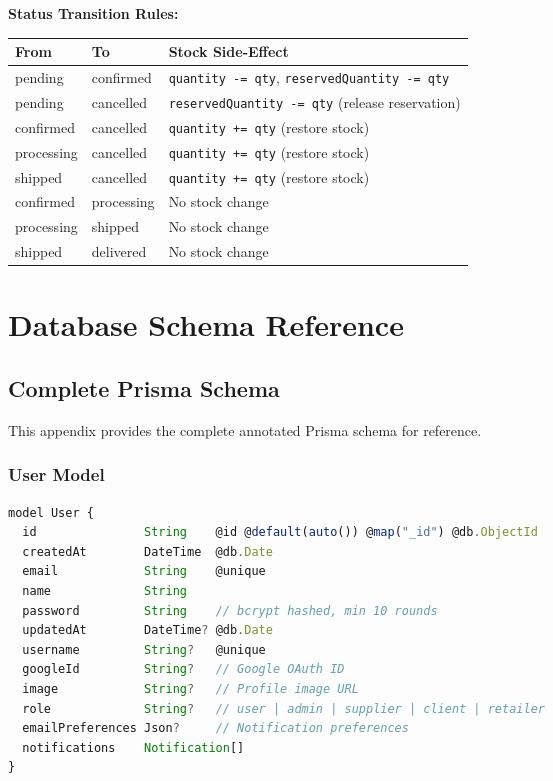 ﻿\documentclass[12pt,a4paper]{report}
\begin{document}
\textbf{Status Transition Rules:}
\begin{center}
\begin{tabularx}{\textwidth}{llX}
  \toprule
  \textbf{From} & \textbf{To} & \textbf{Stock Side-Effect} \\
  \midrule
  pending    & confirmed   & \texttt{quantity -= qty}, \texttt{reservedQuantity -= qty} \\
  pending    & cancelled   & \texttt{reservedQuantity -= qty} (release reservation) \\
  confirmed  & cancelled   & \texttt{quantity += qty} (restore stock) \\
  processing & cancelled   & \texttt{quantity += qty} (restore stock) \\
  shipped    & cancelled   & \texttt{quantity += qty} (restore stock) \\
  confirmed  & processing  & No stock change \\
  processing & shipped     & No stock change \\
  shipped    & delivered   & No stock change \\
  \bottomrule
\end{tabularx}
\end{center}

\chapter{Database Schema Reference}

\section{Complete Prisma Schema}

This appendix provides the complete annotated Prisma schema for reference.

\subsection{User Model}

\begin{lstlisting}[language=JavaScript,caption={User model}]
model User {
  id               String    @id @default(auto()) @map("_id") @db.ObjectId
  createdAt        DateTime  @db.Date
  email            String    @unique
  name             String
  password         String    // bcrypt hashed, min 10 rounds
  updatedAt        DateTime? @db.Date
  username         String?   @unique
  googleId         String?   // Google OAuth ID
  image            String?   // Profile image URL
  role             String?   // user | admin | supplier | client | retailer
  emailPreferences Json?     // Notification preferences
  notifications    Notification[]
}
\end{lstlisting}
\end{document}
